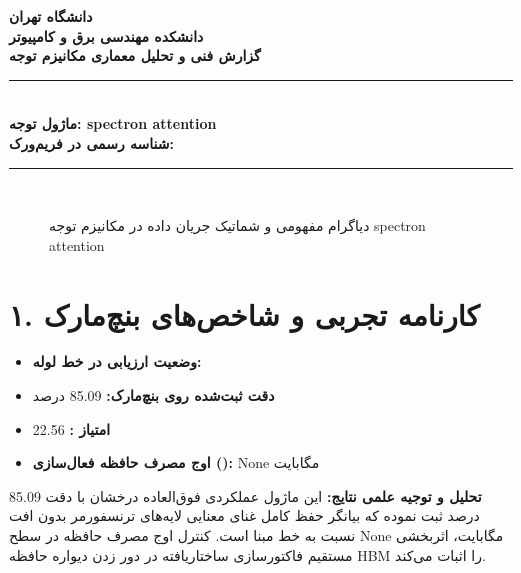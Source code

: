 \documentclass[12pt,a4paper]{article}
\begin{document}
\begin{center}
{\Large\bfseries دانشگاه تهران}\\[0.2cm]
{\large\bfseries دانشکده مهندسی برق و کامپیوتر}\\[0.2cm]
{\large\bfseries گزارش فنی و تحلیل معماری مکانیزم توجه}\\[0.5cm]
\rule{\linewidth}{1pt}\\[0.3cm]
{\LARGE\bfseries ماژول توجه: spectron attention}\\[0.2cm]
{\large \textbf{شناسه رسمی در فریم‌ورک:} }\\[0.2cm]
\rule{\linewidth}{1pt}\\[0.5cm]
\end{center}

\begin{figure}[H]
\centering
{}
\caption{دیاگرام مفهومی و شماتیک جریان داده در مکانیزم توجه spectron attention}
\end{figure}

\section*{۱. کارنامه تجربی و شاخص‌های بنچ‌مارک}
\begin{itemize}
\item \textbf{وضعیت ارزیابی در خط لوله:} 
\item \textbf{دقت ثبت‌شده روی بنچ‌مارک:} 85.09 درصد
\item \textbf{امتیاز :} 22.56
\item \textbf{اوج مصرف حافظه فعال‌سازی ():} None مگابایت
\end{itemize}
\textbf{تحلیل و توجیه علمی نتایج:} این ماژول عملکردی فوق‌العاده درخشان با دقت 85.09 درصد ثبت نموده که بیانگر حفظ کامل غنای معنایی لایه‌های ترنسفورمر بدون افت نسبت به خط مبنا است. کنترل اوج مصرف حافظه در سطح None مگابایت، اثربخشی مستقیم فاکتورسازی ساختاریافته در دور زدن دیواره حافظه HBM را اثبات می‌کند.
\end{document}
